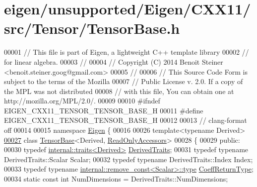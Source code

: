 \hypertarget{eigen_2unsupported_2_eigen_2_c_x_x11_2src_2_tensor_2_tensor_base_8h_source}{}\section{eigen/unsupported/\+Eigen/\+C\+X\+X11/src/\+Tensor/\+Tensor\+Base.h}
\label{eigen_2unsupported_2_eigen_2_c_x_x11_2src_2_tensor_2_tensor_base_8h_source}

\begin{DoxyCode}
00001 \textcolor{comment}{// This file is part of Eigen, a lightweight C++ template library}
00002 \textcolor{comment}{// for linear algebra.}
00003 \textcolor{comment}{//}
00004 \textcolor{comment}{// Copyright (C) 2014 Benoit Steiner <benoit.steiner.goog@gmail.com>}
00005 \textcolor{comment}{//}
00006 \textcolor{comment}{// This Source Code Form is subject to the terms of the Mozilla}
00007 \textcolor{comment}{// Public License v. 2.0. If a copy of the MPL was not distributed}
00008 \textcolor{comment}{// with this file, You can obtain one at http://mozilla.org/MPL/2.0/.}
00009 
00010 \textcolor{preprocessor}{#ifndef EIGEN\_CXX11\_TENSOR\_TENSOR\_BASE\_H}
00011 \textcolor{preprocessor}{#define EIGEN\_CXX11\_TENSOR\_TENSOR\_BASE\_H}
00012 
00013 \textcolor{comment}{// clang-format off}
00014 
00015 \textcolor{keyword}{namespace }\hyperlink{namespace_eigen}{Eigen} \{
00016 
00026 \textcolor{keyword}{template}<\textcolor{keyword}{typename} Derived>
\hyperlink{class_eigen_1_1_tensor_base_3_01_derived_00_01_read_only_accessors_01_4}{00027} \textcolor{keyword}{class }\hyperlink{class_eigen_1_1_tensor_base}{TensorBase}<Derived, \hyperlink{group__enums_gga9f93eac38eb83deb0e8dbd42ddf11d5da42865f87356ad7e585a1bfbfd1b81699}{ReadOnlyAccessors}>
00028 \{
00029   \textcolor{keyword}{public}:
00030     \textcolor{keyword}{typedef} \hyperlink{struct_eigen_1_1internal_1_1traits}{internal::traits<Derived>} \hyperlink{struct_eigen_1_1internal_1_1traits}{DerivedTraits};
00031     \textcolor{keyword}{typedef} \textcolor{keyword}{typename} DerivedTraits::Scalar Scalar;
00032     \textcolor{keyword}{typedef} \textcolor{keyword}{typename} DerivedTraits::Index Index;
00033     \textcolor{keyword}{typedef} \textcolor{keyword}{typename} \hyperlink{group___sparse_core___module}{internal::remove\_const<Scalar>::type} 
      \hyperlink{group___sparse_core___module}{CoeffReturnType};
00034     \textcolor{keyword}{static} \textcolor{keyword}{const} \textcolor{keywordtype}{int} NumDimensions = DerivedTraits::NumDimensions;

\end{DoxyCode}
